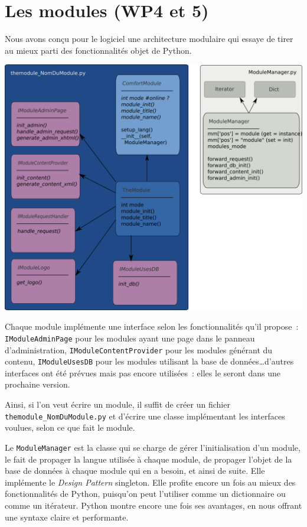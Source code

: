 \documentclass[final,11pt,a4paper,twoside,titlepage]{article}
\newcommand{\p}{\vspace{0.3em}}
\newcommand{\code}[1]{\texttt{#1}}
\begin{document}
{  
  
  \section{Les modules (WP4 et 5)}
  

    
    Nous avons conçu pour le logiciel une architecture modulaire qui essaye de
    tirer au mieux parti des fonctionnalités objet de Python.\p

    \begin{center}
      \includegraphics[width=16cm]{rect3581.png}
    \end{center}

    Chaque module implémente une interface selon les fonctionnalités qu'il
    propose~: \code{IModuleAdminPage} pour les modules ayant une page dans le
    panneau d'administration, \code{IModuleContentProvider} pour les modules
    générant du contenu, \code{IModuleUsesDB} pour les modules utilisant la base
    de données\ldots d'autres interfaces ont été prévues mais pas encore
    utilisées~: elles le seront dans une prochaine version.\p

    Ainsi, si l'on veut écrire un module, il suffit de créer un fichier
    \code{themodule\_NomDuModule.py} et d'écrire une classe implémentant les
    interfaces voulues, selon ce que fait le module.\p
    
    Le \code{ModuleManager} est la classe qui se charge de gérer
    l'initialisation d'un module, le fait de propager la langue utilisée à
    chaque module, de propager l'objet de la base de données à chaque module qui
    en a besoin, et ainsi de suite. Elle implémente le \emph{Design Pattern}
    singleton. Elle profite encore un fois au mieux des fonctionnalités de
    Python, puisqu'on peut l'utiliser comme un dictionnaire ou comme un
    itérateur. Python montre encore une fois ses avantages, en nous offrant une
    syntaxe claire et performante.\p

}
\end{document}
